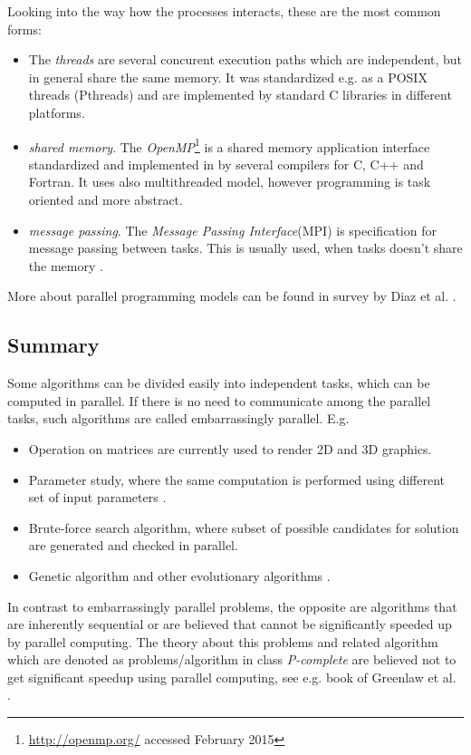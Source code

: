 Looking into the way how the processes interacts, these are the most common forms:
\begin{itemize}
\item{The \emph{threads} are several concurent execution paths which are independent, but in general share the same memory. It was standardized e.g. as a POSIX threads  (Pthreads) and are implemented by standard C libraries in different platforms\cite{Butenhof1997}.}
\item{\emph{shared memory}. The \emph{OpenMP}\footnote{\url{http://openmp.org/} accessed February 2015} is a shared memory application interface standardized and implemented in by several compilers for C, C++ and Fortran. It uses also multithreaded model, however programming is task oriented and more abstract\cite{Chapman2008}. }
\item{\emph{message passing}. The \emph{Message Passing Interface}(MPI) is specification for message passing between tasks. This is usually used, when tasks doesn't share the memory \cite{Pacheco1997}.
}
\end{itemize}
More about parallel programming models can be found in survey by Diaz et al. \cite{Diaz2012}.
\subsection{Summary}

Some algorithms can be divided easily into independent tasks, which can be computed in parallel. If there is no need to communicate among the parallel tasks, such algorithms are called embarrassingly parallel. E.g. 
\begin{itemize}
\item{Operation on matrices  \cite{Moler1986} are currently used to render 2D and 3D graphics.}
\item{Parameter study, where the same computation is performed using different set of input parameters \cite{Foster1995}.}
\item{Brute-force search algorithm, where subset of possible candidates for solution are generated and checked in parallel.}
\item{Genetic algorithm and other evolutionary algorithms \cite{Cantu-Paz1999}.}
\end{itemize}
In contrast to embarrassingly parallel problems, the opposite are algorithms that are inherently sequential or are believed that cannot be significantly speeded up by parallel computing. The theory about this problems and related algorithm which are denoted as problems/algorithm in class \emph{P-complete} are believed not to get significant speedup using parallel computing, see e.g. book of Greenlaw et al. \cite{Greenlaw1995}. 

